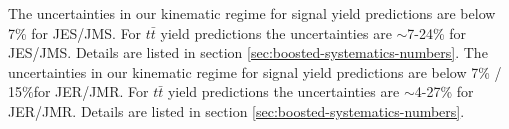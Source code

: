 The uncertainties in our kinematic regime for signal yield predictions are below 7\% for JES/JMS. For $t\bar{t}$ yield predictions the uncertainties are $\sim$7-24\% for JES/JMS. Details are listed in section \ref{sec:boosted-systematics-numbers}. The uncertainties in our kinematic regime for signal yield predictions are below 7\% / 15\%for JER/JMR. For $t\bar{t}$ yield predictions the uncertainties are $\sim$4-27\% for JER/JMR. Details are listed in section \ref{sec:boosted-systematics-numbers}.



